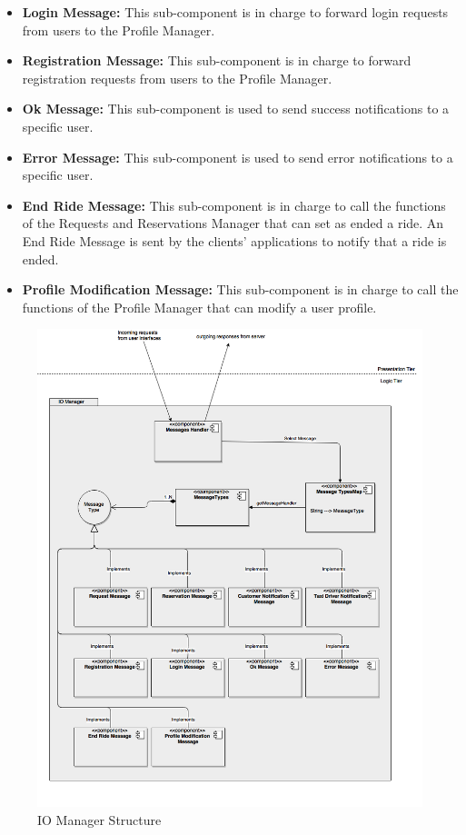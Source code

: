 \documentclass[../../../../../../../dd.tex]{subfiles}
\begin{document}
\begin{itemize}
			\item \textbf{Login Message:} This sub-component is in charge to forward login requests from users to the Profile Manager.

			\item \textbf{Registration Message:} This sub-component is in charge to forward registration requests from users to the Profile Manager.

			\item \textbf{Ok Message:} This sub-component is used to send success notifications to a specific user.

			\item \textbf{Error Message:} This sub-component is used to send error notifications to a specific user.

			\item \textbf{End Ride Message:} This sub-component is in charge to call the functions of the Requests and Reservations Manager that can set as ended a ride. An End Ride Message is sent by the clients' applications to notify that a ride is ended.

			\item \textbf{Profile Modification Message:} This sub-component is in charge to call the functions of the Profile Manager that can modify a user profile.
			
		\end{itemize}

		\begin{figure}[H]
				\centering
				\includegraphics[width=\textwidth, scale=0.5]{../images/IOManager.png}
			\caption{IO Manager Structure}\label{fig:IOManager}
		\end{figure}
	
\end{document}

